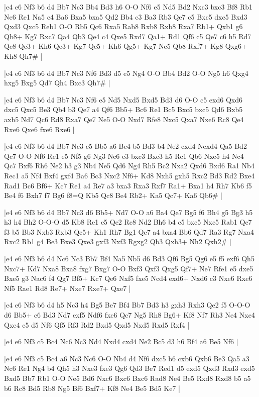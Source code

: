 \whitename{}
\blackname{}
\makegametitle
|e4 e6 Nf3 b6 d4 Bb7 Nc3 Bb4 Bd3 h6 O-O Nf6 e5 Nd5 Bd2 Nxc3 bxc3 Bf8 Rb1 Nc6 Re1 Na5 c4 Ba6 Bxa5 bxa5 Qd2 Bb4 c3 Ba3 Rb3 Qe7 c5 Bxc5 dxc5 Bxd3 Qxd3 Qxc5 Reb1 O-O Rb5 Qc6 Rxa5 Rab8 Rxb8 Rxb8 Rxa7 Rb1+ Qxb1 g6 Qb8+ Kg7 Rxc7 Qa4 Qb3 Qe4 c4 Qxe5 Rxd7 Qa1+ Rd1 Qf6 c5 Qe7 c6 h5 Rd7 Qe8 Qc3+ Kh6 Qe3+ Kg7 Qe5+ Kh6 Qg5+ Kg7 Ne5 Qb8 Rxf7+ Kg8 Qxg6+ Kh8 Qh7\#  |

\whitename{}
\blackname{}
\makegametitle
|e4 e6 Nf3 b6 d4 Bb7 Nc3 Nf6 Bd3 d5 e5 Ng4 O-O Bb4 Bd2 O-O Ng5 h6 Qxg4 hxg5 Bxg5 Qd7 Qh4 Bxc3 Qh7\#  |

\whitename{}
\blackname{}
\makegametitle
|e4 e6 Nf3 b6 d4 Bb7 Nc3 Nf6 e5 Nd5 Nxd5 Bxd5 Bd3 d6 O-O c5 exd6 Qxd6 dxc5 Qxc5 Be3 Qb4 b3 Qe7 a4 Qf6 Bb5+ Bc6 Re1 Bc5 Bxc5 bxc5 Qd6 Bxb5 axb5 Nd7 Qc6 Rd8 Rxa7 Qe7 Ne5 O-O Nxd7 Rfe8 Nxc5 Qxa7 Nxe6 Rc8 Qe4 Rxe6 Qxe6 fxe6 Rxe6  |

\whitename{}
\blackname{}
\makegametitle
|e4 e6 Nf3 b6 d4 Bb7 Nc3 c5 Bb5 a6 Bc4 b5 Bd3 b4 Ne2 cxd4 Nexd4 Qa5 Bd2 Qc7 O-O Nf6 Re1 e5 Nf5 g6 Ng3 Nc6 c3 bxc3 Bxc3 h5 Rc1 Qb6 Nxe5 h4 Nc4 Qc7 Bxf6 Rh6 Ne2 h3 g3 Nb4 Ne5 Qd6 Ng4 Rh5 Bc2 Nxa2 Qxd6 Bxd6 Ra1 Nb4 Rec1 a5 Nf4 Bxf4 gxf4 Ba6 Bc3 Nxc2 Nf6+ Kd8 Nxh5 gxh5 Rxc2 Bd3 Rd2 Bxe4 Rad1 Bc6 Bf6+ Kc7 Re1 a4 Re7 a3 bxa3 Rxa3 Rxf7 Ra1+ Bxa1 h4 Rh7 Kb6 f5 Be4 f6 Bxh7 f7 Bg6 f8=Q Kb5 Qc8 Be4 Rb2+ Ka5 Qc7+ Ka6 Qb6\#  |

\whitename{}
\blackname{}
\makegametitle
|e4 e6 Nf3 b6 d4 Bb7 Nc3 d6 Bb5+ Nd7 O-O a6 Ba4 Qe7 Bg5 f6 Bh4 g5 Bg3 h5 h3 h4 Bh2 O-O-O d5 Kb8 Re1 e5 Qe2 Rc8 Nd2 Bh6 b4 c5 bxc5 Nxc5 Rab1 Qc7 f3 b5 Bb3 Nxb3 Rxb3 Qc5+ Kh1 Rh7 Bg1 Qc7 a4 bxa4 Bb6 Qd7 Ra3 Rg7 Nxa4 Rxc2 Rb1 g4 Be3 Bxe3 Qxe3 gxf3 Nxf3 Rgxg2 Qb3 Qxh3+ Nh2 Qxh2\#  |

\whitename{}
\blackname{}
\makegametitle
|e4 e6 Nf3 b6 d4 Nc6 Nc3 Bb7 Bf4 Na5 Nb5 d6 Bd3 Qf6 Bg5 Qg6 e5 f5 exf6 Qh5 Nxc7+ Kd7 Nxa8 Bxa8 fxg7 Bxg7 O-O Bxf3 Qxf3 Qxg5 Qf7+ Ne7 Rfe1 e5 dxe5 Bxe5 g3 Nac6 f4 Qg7 Bf5+ Kc7 Qe6 Nxf5 fxe5 Ncd4 exd6+ Nxd6 c3 Nxe6 Rxe6 Nf5 Rae1 Rd8 Re7+ Nxe7 Rxe7+ Qxe7  |

\whitename{}
\blackname{}
\makegametitle
|e4 e6 Nf3 b6 d4 h5 Nc3 h4 Bg5 Be7 Bf4 Bb7 Bd3 h3 gxh3 Rxh3 Qe2 f5 O-O-O d6 Bb5+ c6 Bd3 Nd7 exf5 Ndf6 fxe6 Qc7 Ng5 Rh8 Bg6+ Kf8 Nf7 Rh3 Ne4 Nxe4 Qxe4 c5 d5 Nf6 Qf5 Rf3 Rd2 Bxd5 Qxd5 Nxd5 Rxd5 Rxf4  |

\whitename{}
\blackname{}
\makegametitle
|e4 e6 Nf3 c5 Bc4 Nc6 Nc3 Nd4 Nxd4 cxd4 Ne2 Bc5 d3 h6 Bf4 a6 Be5 Nf6  |

\whitename{}
\blackname{}
\makegametitle
|e4 e6 Nf3 c5 Bc4 a6 Nc3 Nc6 O-O Nb4 d4 Nf6 dxc5 b6 cxb6 Qxb6 Be3 Qa5 a3 Nc6 Re1 Ng4 b4 Qh5 h3 Nxe3 fxe3 Qg6 Qd3 Be7 Red1 d5 exd5 Qxd3 Rxd3 exd5 Bxd5 Bb7 Rb1 O-O Ne5 Bd6 Nxc6 Bxc6 Bxc6 Rad8 Ne4 Be5 Rxd8 Rxd8 b5 a5 b6 Rc8 Bd5 Rb8 Ng5 Bf6 Bxf7+ Kf8 Ne4 Be5 Bd5 Ke7  |

